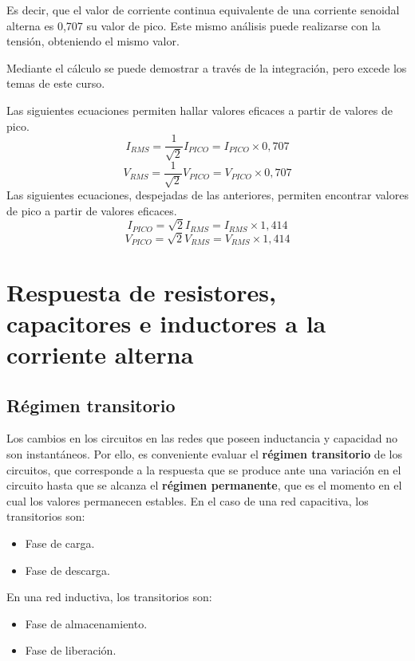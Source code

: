 Es decir, que el valor de corriente continua equivalente de una corriente senoidal alterna es 0,707 su valor de pico. Este mismo análisis puede realizarse con la tensión, obteniendo el mismo valor.

Mediante el cálculo se puede demostrar a través de la integración, pero excede los temas de este curso.

\begin{conclusiones}
	Las siguientes ecuaciones permiten hallar valores eficaces a partir de valores de pico.
	\begin{equation}
		I_{RMS} = \frac{1}{\sqrt{2}}I_{PICO}=I_{PICO}\times 0,707
	\end{equation}
	\begin{equation}
		V_{RMS} = \frac{1}{\sqrt{2}}V_{PICO}=V_{PICO}\times 0,707
	\end{equation}
	Las siguientes ecuaciones, despejadas de las anteriores, permiten encontrar valores de pico a partir de valores eficaces.
	\begin{equation}
		I_{PICO} = \sqrt{2}I_{RMS}=I_{RMS}\times 1,414
	\end{equation}
	\begin{equation}
		V_{PICO} = \sqrt{2}V_{RMS}=V_{RMS}\times 1,414
	\end{equation}
\end{conclusiones}

\section{Respuesta de resistores, capacitores e inductores a la corriente alterna}
\subsection{Régimen transitorio}
Los cambios en los circuitos en las redes que poseen inductancia y capacidad no son instantáneos. Por ello, es conveniente evaluar el \textbf{régimen transitorio} de los circuitos, que corresponde a la respuesta que se produce ante una variación en el circuito hasta que se alcanza el \textbf{régimen permanente}, que es el momento en el cual los valores permanecen estables.
En el caso de una red capacitiva, los transitorios son:
\begin{itemize}
	\item Fase de carga.
	\item Fase de descarga.
\end{itemize}
En una red inductiva, los transitorios son:
\begin{itemize}
	\item Fase de almacenamiento.
	\item Fase de liberación.
\end{itemize}
